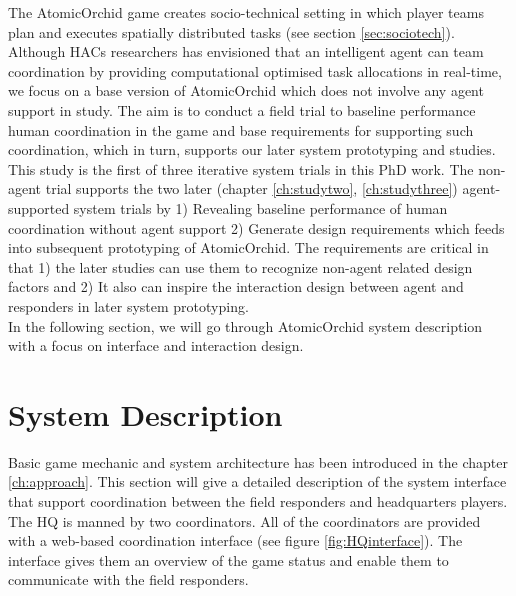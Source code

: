 The AtomicOrchid game creates socio-technical setting in which player teams plan and executes spatially distributed tasks (see section \ref{sec:sociotech}). Although HACs researchers has envisioned that an intelligent agent can team coordination by providing computational optimised task allocations in real-time, we focus on a base version of AtomicOrchid which does not involve any agent support in study. The aim is to conduct a field trial to baseline performance human coordination in the game and base requirements for supporting such coordination, which in turn, supports our later system prototyping and studies. \\

This study is the first of three iterative system trials in this PhD work. The non-agent trial supports the two later (chapter \ref{ch:studytwo}, \ref{ch:studythree}) agent-supported system trials by 1) Revealing baseline performance of human coordination without agent support 2) Generate design requirements which feeds into subsequent prototyping of AtomicOrchid. The requirements are critical in that 1) the later studies can use them to recognize non-agent related design factors and 2) It also can inspire the interaction design between agent and responders in later system prototyping.  \\

In the following section, we will go through AtomicOrchid system description with a focus on interface and interaction design.\\

\section{System Description}\label{sec:system1}
Basic game mechanic and system architecture has been introduced in the chapter \ref{ch:approach}. This section will give a detailed description of the system interface that support coordination between the field responders and headquarters players. \\

The HQ is manned by two coordinators. All of the coordinators are provided with a web-based coordination interface (see figure \ref{fig:HQinterface}). The interface gives them an overview of the game status and enable them to communicate with the field responders. \\

